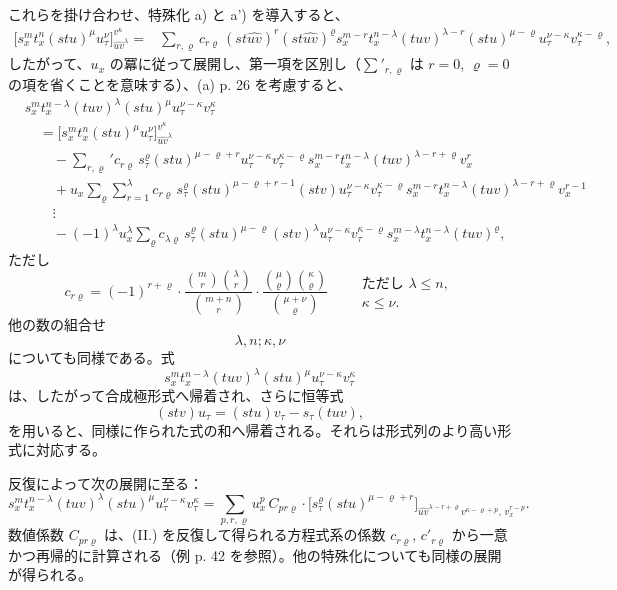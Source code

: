 \documentclass[11pt]{article}
\begin{document}
これらを掛け合わせ、特殊化 a) と a') を導入すると、
\[
\begin{aligned}
\bigl[s_x^m t_x^n(stu)^\mu u_\tau^\nu\bigr]_{\widehat{uv}^{\lambda}}^{v^\kappa}
={}&
\sum_{r,\varrho}c_{r\varrho}\,
(st\widehat{uv})^r(st\widehat{uv})^\varrho
s_x^{m-r}t_x^{n-\lambda}(tuv)^{\lambda-r}(stu)^{\mu-\varrho}
u_\tau^{\nu-\kappa}v_\tau^{\kappa-\varrho},
\end{aligned}
\]
したがって、$u_x$ の冪に従って展開し、第一項を区別し（$\sum'_{r,\varrho}$ は $r=0$, $\varrho=0$ の項を省くことを意味する）、(a) p. 26 を考慮すると、
\[
\tag{II}
\begin{aligned}
&s_x^m t_x^{n-\lambda}(tuv)^\lambda(stu)^\mu u_\tau^{\nu-\kappa}v_\tau^\kappa\\
&\quad =
\bigl[s_x^m t_x^n(stu)^\mu u_\tau^\nu\bigr]_{\widehat{uv}^{\lambda}}^{v^\kappa}\\
&\qquad
-\sum_{r,\varrho}' c_{r\varrho}\,s_\tau^\varrho(stu)^{\mu-\varrho+r}
u_\tau^{\nu-\kappa}v_\tau^{\kappa-\varrho}
s_x^{m-r}t_x^{n-\lambda}(tuv)^{\lambda-r+\varrho}v_x^r\\
&\qquad
+u_x\sum_{\varrho}\sum_{r=1}^{\lambda} c_{r\varrho}\,
s_\tau^\varrho(stu)^{\mu-\varrho+r-1}(stv)
u_\tau^{\nu-\kappa}v_\tau^{\kappa-\varrho}
s_x^{m-r}t_x^{n-\lambda}(tuv)^{\lambda-r+\varrho}v_x^{r-1}\\
&\qquad
\vdots\\
&\qquad
-(-1)^\lambda u_x^\lambda\sum_\varrho c_{\lambda\varrho}\,
s_\tau^\varrho(stu)^{\mu-\varrho}(stv)^\lambda
u_\tau^{\nu-\kappa}v_\tau^{\kappa-\varrho}
s_x^{m-\lambda}t_x^{n-\lambda}(tuv)^\varrho,
\end{aligned}
\]
ただし
\[
c_{r\varrho}=(-1)^{r+\varrho}\cdot
\frac{\binom{m}{r}\binom{\lambda}{r}}{\binom{m+n}{r}}\cdot
\frac{\binom{\mu}{\varrho}\binom{\kappa}{\varrho}}{\binom{\mu+\nu}{\varrho}}
\qquad
\begin{array}{l}
\text{ただし }\lambda\le n,\\
\kappa\le\nu.
\end{array}
\]
他の数の組合せ
\[\lambda,n;\kappa,\nu\]
についても同様である。式
\[s_x^m t_x^{n-\lambda}(tuv)^\lambda(stu)^\mu u_\tau^{\nu-\kappa}v_\tau^\kappa\]
は、したがって合成極形式へ帰着され、さらに恒等式
\[
(stv)u_\tau=(stu)v_\tau-s_\tau(tuv),
\]
を用いると、同様に作られた式の和へ帰着される。それらは形式列のより高い形式に対応する。

反復によって次の展開に至る：
\[
\tag{III}
s_x^m t_x^{n-\lambda}(tuv)^\lambda(stu)^\mu u_\tau^{\nu-\kappa}v_\tau^\kappa
=
\sum_{p,r,\varrho}u_x^p\,C_{pr\varrho}\cdot
\bigl[s_\tau^\varrho(stu)^{\mu-\varrho+r}\bigr]_{\widehat{uv}^{\lambda-r+\varrho}v^{\kappa-\varrho+p},\,v_x^{r-p}}.
\]
数値係数 $C_{pr\varrho}$ は、(II.) を反復して得られる方程式系の係数 $c_{r\varrho}$, $c'_{r\varrho}$ から一意かつ再帰的に計算される（例 p. 42 を参照）。他の特殊化についても同様の展開が得られる。
\end{document}
